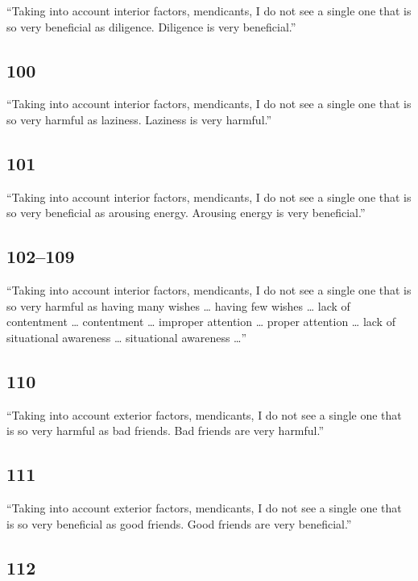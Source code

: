 \documentclass[12pt,openany]{book}%
\begin{document}
“Taking into account interior factors, mendicants, I do not see a single one that is so very beneficial as diligence. Diligence is very beneficial.” 

\subsection*{100 }

“Taking into account interior factors, mendicants, I do not see a single one that is so very harmful as laziness. Laziness is very harmful.” 

\subsection*{101 }

“Taking into account interior factors, mendicants, I do not see a single one that is so very beneficial as arousing energy. Arousing energy is very beneficial.” 

\subsection*{102–109 }

“Taking into account interior factors, mendicants, I do not see a single one that is so very harmful as having many wishes … having few wishes … lack of contentment … contentment … improper attention … proper attention … lack of situational awareness … situational awareness …” 

\subsection*{110 }

“Taking into account exterior factors, mendicants, I do not see a single one that is so very harmful as bad friends. Bad friends are very harmful.” 

\subsection*{111 }

“Taking into account exterior factors, mendicants, I do not see a single one that is so very beneficial as good friends. Good friends are very beneficial.” 

\subsection*{112 }
\end{document}
